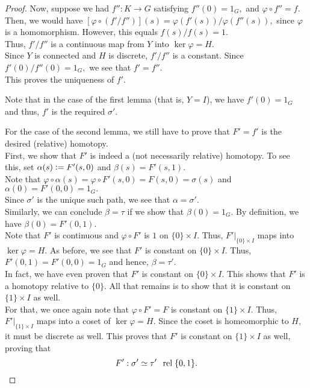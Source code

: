 \documentclass[12pt]{article}
\theoremstyle{definition}
\numberwithin{thm}{section}
\newcommand{\rel}{\;\;\operatorname{rel}\;}
\begin{document}
\begin{proof}
 	Now, suppose we had $f'': K \to G$ satisfying $f''(0) = 1_G,$ and $\varphi\circ f'' = f.$\\
 	Then, we would have $[\varphi\circ(f'/f'')](s) = \varphi(f'(s))/\varphi(f''(s)),$ since $\varphi$ is a homomorphism. However, this equals $f(s)/f(s) = 1.$\\
 	Thus, $f'/f''$ is a continuous map from $Y$ into $\ker\varphi = H.$\\
 	Since $Y$ is connected and $H$ is discrete, $f'/f''$ is a constant. Since $f'(0)/f''(0) = 1_G,$ we see that $f' = f''.$\\
 	This proves the uniqueness of $f'.$

 	Note that in the case of the first lemma (that is, $Y = I$), we have $f'(0) = 1_G$ and thus, $f'$ is the required $\sigma'.$

 	For the case of the second lemma, we still have to prove that $F' = f'$ is the desired (relative) homotopy.\\
 	First, we show that $F'$ is indeed a (not necessarily relative) homotopy. To see this, set $\alpha(s) \vcentcolon= F'(s, 0)$ and $\beta(s) = F'(s, 1).$\\
 	Note that $\varphi\circ \alpha(s) = \varphi \circ F'(s, 0) = F(s, 0) = \sigma(s)$ and $\alpha(0) = F'(0, 0) = 1_G.$ \\
 	Since $\sigma'$ is the unique such path, we see that $\alpha = \sigma'.$\\
 	Similarly, we can conclude $\beta = \tau$ if we show that $\beta(0) = 1_G.$ By definition, we have $\beta(0) = F'(0, 1).$ \\
 	Note that $F'$ is continuous and $\varphi \circ F'$ is $1$ on $\{0\} \times I.$ Thus, $F'|_{\{0\} \times I}$ maps into $\ker \varphi = H.$ As before, we see that $F'$ is constant on $\{0\} \times I.$ Thus, $F'(0, 1) = F'(0, 0) = 1_G$ and hence, $\beta = \tau'.$\\
 	In fact, we have even proven that $F'$ is constant on $\{0\} \times I.$ This shows that $F'$ is a homotopy relative to $\{0\}.$ All that remains is to show that it is constant on $\{1\} \times I$ as well.\\
 	For that, we once again note that $\varphi\circ F' = F$ is constant on $\{1\}\times I.$ Thus, $F'|_{\{1\}\times I}$ maps into a coset of $\ker \varphi = H.$ Since the coset is homeomorphic to $H,$ it must be discrete as well. This proves that $F'$ is constant on $\{1\} \times I$ as well, proving that
 	\begin{equation*} 
 		F' : \sigma' \simeq \tau' \rel \{0, 1\}. \qedhere
 	\end{equation*}
 \end{proof} 
\end{document}

